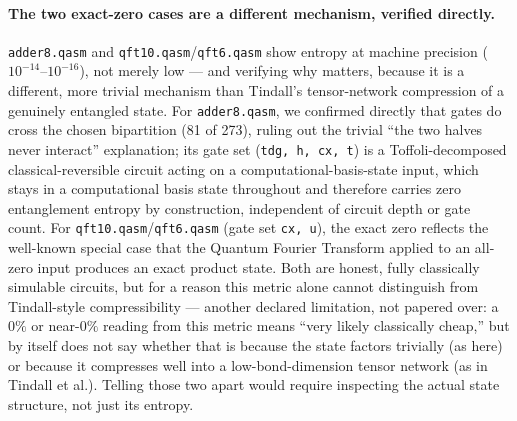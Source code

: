 \documentclass[9pt,twocolumn]{extarticle}
\begin{document}
\paragraph{The two exact-zero cases are a different mechanism, verified
directly.} \texttt{adder8.qasm} and \texttt{qft10.qasm}/\texttt{qft6.qasm}
show entropy at machine precision ($10^{-14}$--$10^{-16}$), not merely
low --- and verifying why matters, because it is a different, more trivial
mechanism than Tindall's tensor-network compression of a genuinely
entangled state. For \texttt{adder8.qasm}, we confirmed directly that
gates do cross the chosen bipartition (81 of 273), ruling out the trivial
``the two halves never interact'' explanation; its gate set
(\texttt{tdg, h, cx, t}) is a Toffoli-decomposed classical-reversible
circuit acting on a computational-basis-state input, which stays in a
computational basis state throughout and therefore carries zero
entanglement entropy by construction, independent of circuit depth or
gate count. For \texttt{qft10.qasm}/\texttt{qft6.qasm} (gate set
\texttt{cx, u}), the exact zero reflects the well-known special case that
the Quantum Fourier Transform applied to an all-zero input produces an
exact product state. Both are honest, fully classically simulable
circuits, but for a reason this metric alone cannot distinguish from
Tindall-style compressibility --- another declared limitation, not
papered over: a $0\%$ or near-$0\%$ reading from this metric means ``very
likely classically cheap,'' but by itself does not say whether that is
because the state factors trivially (as here) or because it compresses
well into a low-bond-dimension tensor network (as in Tindall et al.).
Telling those two apart would require inspecting the actual state
structure, not just its entropy.

\FloatBarrier
\end{document}
